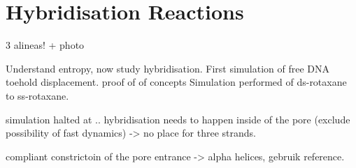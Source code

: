 \section{Hybridisation Reactions}

3 alineas! + photo

Understand entropy, now study hybridisation.
First simulation of free DNA toehold displacement. proof of of concepts
Simulation performed of ds-rotaxane to ss-rotaxane.

simulation halted at ..
hybridisation needs to happen inside of the pore (exclude possibility of fast dynamics)
-> no place for three strands.

compliant constrictoin of the pore entrance -> alpha helices, gebruik reference.


